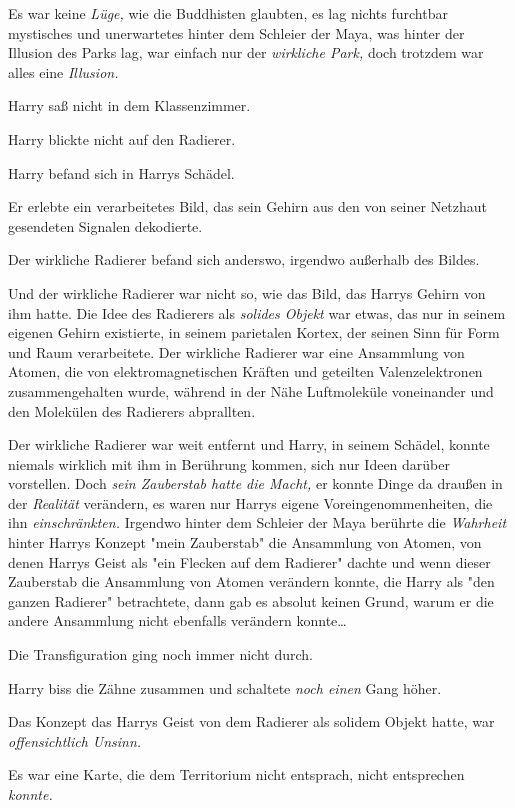 {Es war keine \emph{Lüge,} wie die Buddhisten glaubten, es lag nichts furchtbar mystisches und unerwartetes hinter dem Schleier der Maya, was hinter der Illusion des Parks lag, war einfach nur der \emph{wirkliche Park,} doch trotzdem war alles eine \emph{Illusion.}

Harry saß nicht in dem Klassenzimmer.

Harry blickte nicht auf den Radierer.

Harry befand sich in Harrys Schädel.

Er erlebte ein verarbeitetes Bild, das sein Gehirn aus den von seiner Netzhaut gesendeten Signalen dekodierte.

Der wirkliche Radierer befand sich anderswo, irgendwo außerhalb des Bildes.

Und der wirkliche Radierer war nicht so, wie das Bild, das Harrys Gehirn von ihm hatte. Die Idee des Radierers als \emph{solides Objekt} war etwas, das nur in seinem eigenen Gehirn existierte, in seinem parietalen Kortex, der seinen Sinn für Form und Raum verarbeitete. Der wirkliche Radierer war eine Ansammlung von Atomen, die von elektromagnetischen Kräften und geteilten Valenzelektronen zusammengehalten wurde, während in der Nähe Luftmoleküle voneinander und den Molekülen des Radierers abprallten.

Der wirkliche Radierer war weit entfernt und Harry, in seinem Schädel, konnte niemals wirklich mit ihm in Berührung kommen, sich nur Ideen darüber vorstellen. Doch \emph{sein Zauberstab hatte die Macht,} er konnte Dinge da draußen in der \emph{Realität} verändern, es waren nur Harrys eigene Voreingenommenheiten, die ihn \emph{einschränkten.} Irgendwo hinter dem Schleier der Maya berührte die \emph{Wahrheit} hinter Harrys Konzept "mein Zauberstab" die Ansammlung von Atomen, von denen Harrys Geist als "ein Flecken auf dem Radierer" dachte und wenn dieser Zauberstab die Ansammlung von Atomen verändern konnte, die Harry als "den ganzen Radierer" betrachtete, dann gab es absolut keinen Grund, warum er die andere Ansammlung nicht ebenfalls verändern konnte…

Die Transfiguration ging noch immer nicht durch.

Harry biss die Zähne zusammen und schaltete \emph{noch einen} Gang höher.

Das Konzept das Harrys Geist von dem Radierer als solidem Objekt hatte, war \emph{offensichtlich Unsinn.}

Es war eine Karte, die dem Territorium nicht entsprach, nicht entsprechen \emph{konnte.}

}
